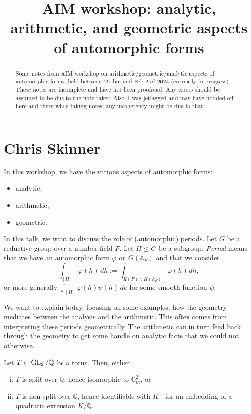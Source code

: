 \documentclass[reqno]{amsart} 
\title{AIM workshop: analytic, arithmetic, and geometric aspects of automorphic forms}
\begin{document}
\maketitle

\begin{abstract}
  Some notes from AIM workshop on arithmetic/geometric/analytic aspects of automorphic forms, held between 29 Jan and Feb 2 of 2024 (currently in progress).  These notes are incomplete and have not been proofread.  Any errors should be assumed to be due to the note-taker.  Also, I was jetlagged and may have nodded off here and there while taking notes; any incoherency might be due to that.
\end{abstract}

\section{Chris Skinner}
In this workshop, we have the various aspects of automorphic forms:
\begin{itemize}
\item analytic,
\item arithmetic,
\item geometric.
\end{itemize}
In this talk, we want to discuss the role of (automorphic) periods.  Let $G$ be a reductive group over a number field $F$.  Let $H \leq G$ be a subgroup. \emph{Period} means that we have an automorphic form $\varphi$ on $G(\mathbb{A}_F)$ and that we consider
\begin{equation*}
  \int_{[H]} \varphi(h) \, d h := \int_{H(F) \backslash H(\mathbb{A}_F)} \varphi(h) \, d h,
\end{equation*}
or more generally $\int_{[H]} \varphi(h) \psi(h) \, d h$ for some smooth function $\psi$.

We want to explain today, focusing on some examples, how the geometry mediates between the analysis and the arithmetic.  This often comes from interpreting these periods geometrically.  The arithmetic can in turn feed back through the geometry to get some handle on analytic facts that we could not otherwise.

Let $T \subset \operatorname{GL}_2 / \mathbb{Q}$ be a torus.  Then, either
\begin{enumerate}[(i)]
\item\label{enumerate:cnej2gipk2} $T$ is split over $\mathbb{Q}$, hence isomorphic to $\mathbb{G}_m^2$, or
\item\label{enumerate:cnej2giqmn} $T$ is non-split over $\mathbb{Q}$, hence identifiable with $K^\times$ for an embedding of a quadratic extension $K /\mathbb{Q}$.
\end{enumerate}
\end{document}
